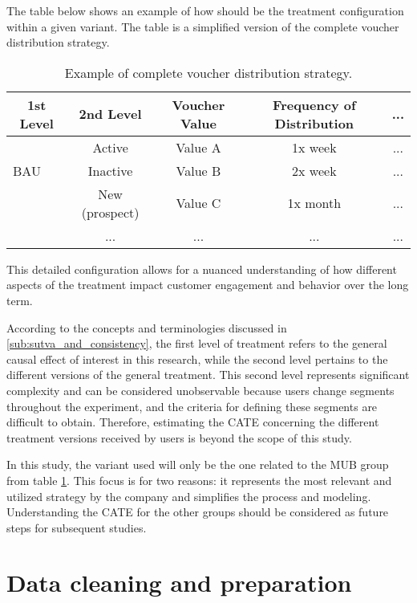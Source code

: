 The table below shows an example of how should be the treatment configuration within a given variant. The table is a simplified version of the complete voucher distribution strategy.

\begin{table}[ht]
  \caption{Example of complete voucher distribution strategy.}
  \label{tab:voucher-distribution}
\centering
\begin{tabular}{lcccc}
  \toprule
  \multicolumn{1}{c}{\textbf{1st Level}} & \textbf{2nd Level} & \textbf{Voucher Value} & \textbf{Frequency of Distribution} & \textbf{...} \\
  \midrule
    & Active & Value A & 1x week & ... \\
  BAU & Inactive & Value B & 2x week & ... \\
    & New (prospect) & Value C & 1x month & ... \\
    &... & ... & ... & ... \\
  \midrule
  \bottomrule
\end{tabular}
\end{table}

This detailed configuration allows for a nuanced understanding of how different aspects of the treatment impact customer engagement and behavior over the long term.

According to the concepts and terminologies discussed in \ref{sub:sutva_and_consistency}, the first level of treatment refers to the general causal effect of interest in this research, while the second level pertains to 
the different versions of the general treatment. This second level represents significant complexity and can be considered unobservable because users change segments throughout the experiment, and the criteria 
for defining these segments are difficult to obtain. Therefore, estimating the CATE concerning the different treatment versions received by users is beyond the scope of this study.

In this study, the variant used will only be the one related to the MUB group from table \ref{tab:voucher-distribution}. This focus is for two reasons: it represents the most relevant and utilized strategy by the
company and simplifies the process and modeling. Understanding the CATE for the other groups should be considered as future steps for subsequent studies.

\section{Data cleaning and preparation}
\label{sub:data_cleaning_and_preparation}

